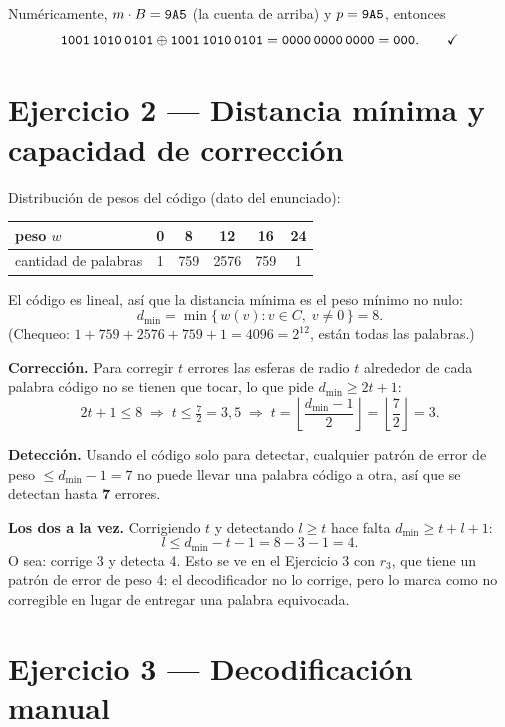 \documentclass[11pt,a4paper]{article}
\begin{document}
Numéricamente, $m\cdot B = \texttt{9A5}$ (la cuenta de arriba) y
$p = \texttt{9A5}$, entonces
\[
  \texttt{1001\,1010\,0101} \oplus \texttt{1001\,1010\,0101}
  = \texttt{0000\,0000\,0000} = \texttt{000}. \qquad \checkmark
\]

\section{Ejercicio 2 --- Distancia mínima y capacidad de corrección}

Distribución de pesos del código (dato del enunciado):

\begin{center}\small
\begin{tabular}{@{}lccccc@{}}
\toprule
peso $w$ & 0 & 8 & 12 & 16 & 24 \\
\midrule
cantidad de palabras & 1 & 759 & 2576 & 759 & 1 \\
\bottomrule
\end{tabular}
\end{center}

El código es lineal, así que la distancia mínima es el peso mínimo no nulo:
\[
  d_{\min} = \min\{\,w(v) : v \in C,\; v \neq 0\,\} = 8 .
\]
(Chequeo: $1+759+2576+759+1 = 4096 = 2^{12}$, están todas las palabras.)

\textbf{Corrección.} Para corregir $t$ errores las esferas de radio $t$
alrededor de cada palabra código no se tienen que tocar, lo que pide
$d_{\min}\ge 2t+1$:
\[
  2t+1 \le 8 \;\Longrightarrow\; t \le \tfrac{7}{2} = 3{,}5
  \;\Longrightarrow\; t = \left\lfloor \frac{d_{\min}-1}{2} \right\rfloor
  = \left\lfloor \frac{7}{2} \right\rfloor = 3 .
\]

\textbf{Detección.} Usando el código solo para detectar, cualquier patrón de
error de peso $\le d_{\min}-1 = 7$ no puede llevar una palabra código a otra,
así que se detectan hasta \textbf{7} errores.

\textbf{Los dos a la vez.} Corrigiendo $t$ y detectando $l\ge t$ hace falta
$d_{\min}\ge t+l+1$:
\[
  l \le d_{\min} - t - 1 = 8 - 3 - 1 = 4 .
\]
O sea: corrige 3 y detecta 4. Esto se ve en el Ejercicio 3 con $r_3$, que
tiene un patrón de error de peso 4: el decodificador no lo corrige, pero lo
marca como no corregible en lugar de entregar una palabra equivocada.

\section{Ejercicio 3 --- Decodificación manual}
\end{document}
